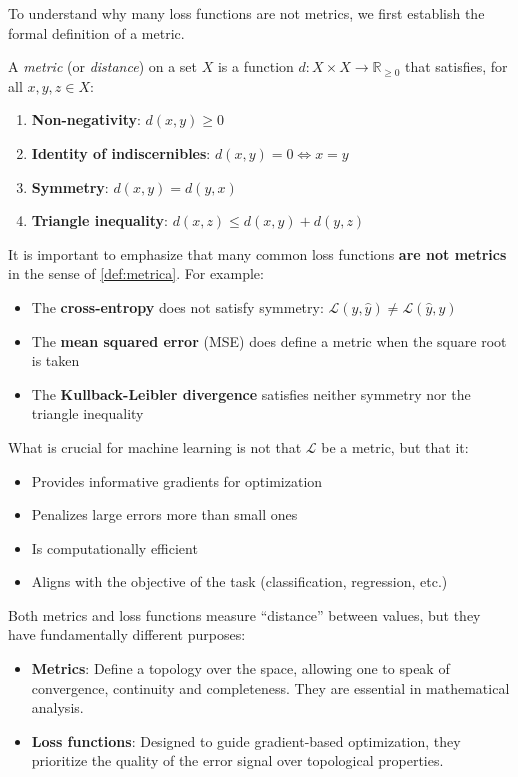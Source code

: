 To understand why many loss functions are not metrics, we first establish the formal definition of a metric.

\begin{definition}[Metric]\label{def:metrica}
	A \textit{metric} (or \textit{distance}) on a set \(X\) is a function \(d: X \times X \to \mathbb{R}_{\geq 0}\) that satisfies, for all \(x, y, z \in X\):
	\begin{enumerate}
		\item \textbf{Non-negativity}: \(d(x, y) \geq 0\)
		\item \textbf{Identity of indiscernibles}: \(d(x, y) = 0 \iff x = y\)
		\item \textbf{Symmetry}: \(d(x, y) = d(y, x)\)
		\item \textbf{Triangle inequality}: \(d(x, z) \leq d(x, y) + d(y, z)\)
	\end{enumerate}
\end{definition}

It is important to emphasize that many common loss functions \textbf{are not metrics} in the sense of \autoref{def:metrica}. For example:
\begin{itemize}
	\item The \textbf{cross-entropy} does not satisfy symmetry: \(\mathcal{L}(y, \hat{y}) \neq \mathcal{L}(\hat{y}, y)\)
	\item The \textbf{mean squared error} (MSE) does define a metric when the square root is taken
	\item The \textbf{Kullback-Leibler divergence} satisfies neither symmetry nor the triangle inequality
\end{itemize}

What is crucial for machine learning is not that \(\mathcal{L}\) be a metric, but that it:
\begin{itemize}
	\item Provides informative gradients for optimization
	\item Penalizes large errors more than small ones
	\item Is computationally efficient
	\item Aligns with the objective of the task (classification, regression, etc.)
\end{itemize}

Both metrics and loss functions measure ``distance'' between values, but they have fundamentally different purposes:
\begin{itemize}
	\item \textbf{Metrics}: Define a topology over the space, allowing one to speak of convergence, continuity and completeness. They are essential in mathematical analysis.
	\item \textbf{Loss functions}: Designed to guide gradient-based optimization, they prioritize the quality of the error signal over topological properties.
\end{itemize}

